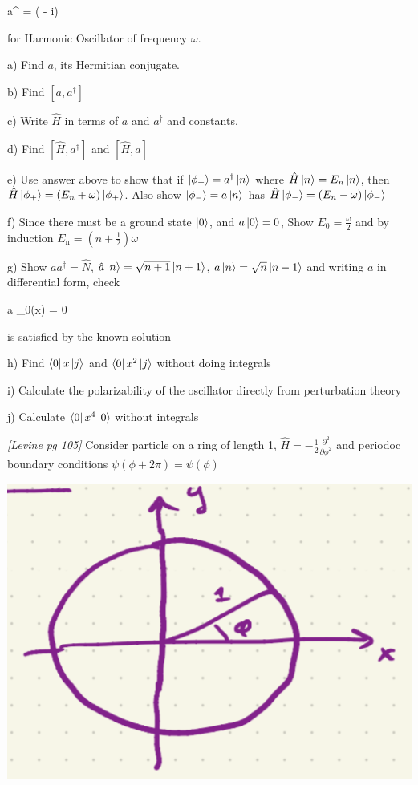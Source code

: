 \be
a^{\dagger} = ( - i)
\ee

for Harmonic Oscillator of frequency $\omega$.

a) Find $a$, its Hermitian conjugate.

b) Find $[a,a^{\dagger}]$

c) Write $\hat{H}$ in terms of $a$ and $a^{\dagger}$ and constants.

d) Find $[\hat{H},a^{\dagger}]$ and $[\hat{H},a]$

e) Use answer above to show that if $\ket{\phi_{+}} = a^{\dagger}\ket{n}$ where
$\hat{H}\ket{n}=E_n\ket{n}$, then $\hat{H}\ket{\phi_+} = (E_n+\omega)\ket{\phi_+}$.
Also show $\ket{\phi_-}=a\ket{n}$ has $\hat{H}\ket{\phi_-} = (E_n-\omega)\ket{\phi_-}$

f) Since there must be a ground state $\ket{0}$, and $a\ket{0}=0$,
Show $E_0=\frac{\omega}{2}$ and by induction $E_{\text{n}}=(n+\frac{1}{2})\omega$

g) Show $aa^{\dagger}=\hat{N}$, $\hat{a}\ket{n} = \sqrt{n+1}\ket{n+1}$, $a\ket{n} = \sqrt{n}\ket{n-1}$
and writing $a$ in differential form, check

\be
a \phi_0(x) = 0
\ee

is satisfied by the known solution

h) Find $\bra{0}x\ket{j}$ and $\bra{0}x^2\ket{j}$ without doing integrals

i) Calculate the polarizability of the oscillator directly from perturbation theory

j) Calculate $\bra{0}x^4\ket{0}$ without integrals

\newpage
{}
{\em [Levine pg 105]}
Consider particle on a ring of length 1, $\hat{H}=-\frac{1}{2}\frac{\partial^2}{\partial\phi^2}$
and periodoc boundary conditions $\psi(\phi+2\pi)=\psi(\phi)$
\begin{center}
\includegraphics[scale=0.5]{particle_ring}
\end{center}

